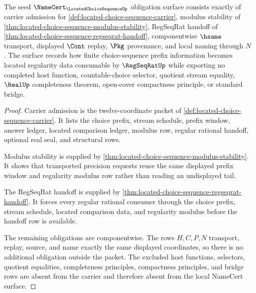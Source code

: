\begin{theorem}
\label{thm:located-choice-sequence-namecert-obligation-surface}
The seed $\NameCert_{\LocatedChoiceSequenceUp}$ obligation surface consists exactly of carrier admission for \autoref{def:located-choice-sequence-carrier}, modulus stability of \autoref{thm:located-choice-sequence-modulus-stability}, RegSeqRat handoff of \autoref{thm:located-choice-sequence-regseqrat-handoff}, componentwise $\hsame$ transport, displayed $\Cont$ replay, $\Pkg$ provenance, and local naming through $N$. The surface records how finite choice-sequence prefix information becomes located regularity data consumable by $\RegSeqRatUp$ while exporting no completed host function, countable-choice selector, quotient stream equality, $\RealUp$ completeness theorem, open-cover compactness principle, or standard bridge.
\end{theorem}
\begin{proof}
Carrier admission is the twelve-coordinate packet of \autoref{def:located-choice-sequence-carrier}. It lists the choice prefix, stream schedule, prefix window, answer ledger, located comparison ledger, modulus row, regular rational handoff, optional real seal, and structural rows.

Modulus stability is supplied by \autoref{thm:located-choice-sequence-modulus-stability}. It shows that transported precision requests reuse the same displayed prefix window and regularity modulus row rather than reading an undisplayed tail.

The RegSeqRat handoff is supplied by \autoref{thm:located-choice-sequence-regseqrat-handoff}. It forces every regular rational consumer through the choice prefix, stream schedule, located comparison data, and regularity modulus before the handoff row is available.

The remaining obligations are componentwise. The rows $H,C,P,N$ transport, replay, source, and name exactly the same displayed coordinates, so there is no additional obligation outside the packet. The excluded host functions, selectors, quotient equalities, completeness principles, compactness principles, and bridge rows are absent from the carrier and therefore absent from the local NameCert surface.
\end{proof}

